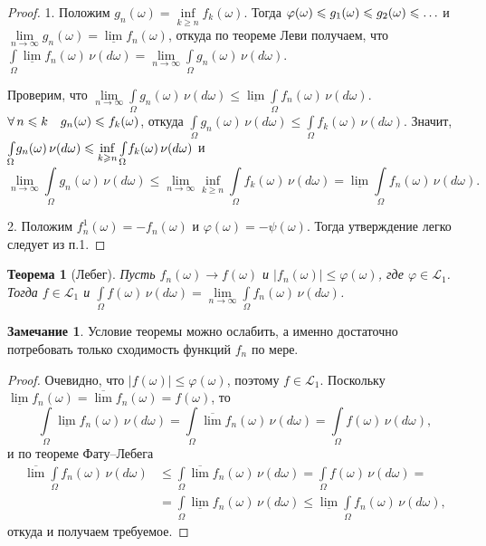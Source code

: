 \documentclass[12pt,titlepage]{article}
\newcounter{tema}
\newtheorem{theorem}{Теорема}[tema]
\theoremstyle{definition}
\newtheorem*{zam}{Замечание}
\newcommand*{\p}[1]{#1\nobreak\discretionary{}{\hbox{$\mathsurround=0pt #1$}}{}}
\begin{document}
\begin{proof}
1. Положим $g_n(\omega)=\inf\limits_{k\geqslant n}f_k(\omega)$.
Тогда $\varphi(\omega)\leqslant g_1(\omega)\p\leqslant
g_2(\omega)\leqslant\ldots$ и $\lim\limits_{n\to\infty}
g_n(\omega)=\underline{\lim}f_n(\omega)$, откуда по теореме Леви
получаем, что
$\int\limits_\Omega\!\underline{\lim}f_n(\omega)\,\nu(d\omega)=
\lim\limits_{n\to\infty}\int\limits_\Omega\!
g_n(\omega)\,\nu(d\omega)$.

Проверим, что
$\lim\limits_{n\to\infty}\int\limits_\Omega\!g_n(\omega)\,\nu(d\omega)
\leqslant \underline{\lim} \int\limits_\Omega\!
f_n(\omega)\,\nu(d\omega)$. $\forall\,n\leqslant k\quad g_n(\omega)
\p\leqslant f_k(\omega)$, откуда $\int\limits_\Omega\! g_n(\omega)\,
\nu(d\omega)\leqslant \int\limits_\Omega\!
f_k(\omega)\,\nu(d\omega)$. Значит, $\int\limits_\Omega\!
g_n(\omega)\, \nu(d\omega)\p\leqslant \inf\limits_{k\geqslant
n}\int\limits_\Omega\! f_k(\omega)\,\nu(d\omega)$ и
$$\lim\limits_{n\to\infty}\int\limits_\Omega\! g_n(\omega)\,\nu(d\omega)
\leqslant\lim\limits_{n\to\infty}\inf\limits_{k\geqslant n}
\int\limits_\Omega \! f_k(\omega)\,\nu(d\omega)= \underline{\lim}
\int\limits_\Omega\! f_n(\omega)\,\nu(d\omega).$$

2. Положим $f_n^1(\omega)=-f_n(\omega)$ и
$\varphi(\omega)=-\psi(\omega)$. Тогда утверждение легко следует из
п.1.
\end{proof}

\begin{theorem}[Лебег]
Пусть $f_n(\omega)\to f(\omega)$ и $|f_n(\omega)|\leqslant
\varphi(\omega)$, где $\varphi\in\mathcal{L}_1$. Тогда
$f\in\mathcal{L}_1$ и $\int\limits_\Omega\! f(\omega)\,\nu(d\omega)
=\lim\limits_{n\to\infty}\int\limits_\Omega\!
f_n(\omega)\,\nu(d\omega)$.
\end{theorem}

\begin{zam}
Условие теоремы можно ослабить, а именно достаточно потребовать
только сходимость функций $f_n$ по мере.
\end{zam}

\begin{proof}
Очевидно, что $|f(\omega)|\leqslant \varphi(\omega)$, поэтому
$f\in\mathcal{L}_1$. Поскольку
$\underline{\lim}f_n(\omega)=\overline{\lim}f_n(\omega)=f(\omega)$,
то $$\int\limits_\Omega\!
\underline{\lim}f_n(\omega)\,\nu(d\omega)=\int\limits_\Omega\!
\overline{\lim}f_n(\omega) \,\nu(d\omega)=
\int\limits_\Omega\!f(\omega)\,\nu(d\omega),$$ и по теореме
Фату--Лебега
\begin{align*}
\overline{\lim}\int\limits_\Omega\!f_n(\omega)\,\nu(d\omega)&\leqslant
\int\limits_\Omega\! \overline{\lim}f_n(\omega)\,\nu(d\omega)=
\int\limits_\Omega\! f(\omega)\,\nu(d\omega)= \\
&=\int\limits_\Omega\!
\underline{\lim}f_n(\omega)\,\nu(d\omega)\leqslant
\underline{\lim}\int\limits_\Omega\!f_n(\omega)\,\nu(d\omega),
\end{align*}
откуда и получаем требуемое.
\end{proof}
\end{document}

